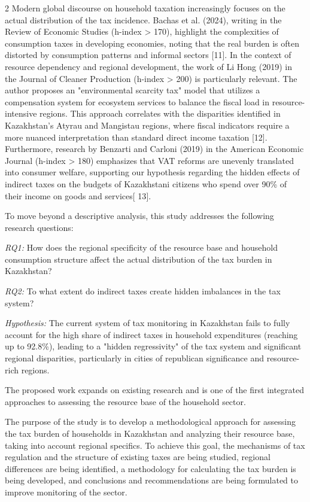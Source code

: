 \begin{multicols}{2}
Modern global discourse on household taxation increasingly focuses on
the actual distribution of the tax incidence. Bachas et al. (2024),
writing in the Review of Economic Studies (h-index \textgreater{} 170),
highlight the complexities of consumption taxes in developing economies,
noting that the real burden is often distorted by consumption patterns
and informal sectors {[}11{]}. In the context of resource dependency and
regional development, the work of Li Hong (2019) in the Journal of
Cleaner Production (h-index \textgreater{} 200) is particularly
relevant. The author proposes an "environmental scarcity tax" model that
utilizes a compensation system for ecosystem services to balance the
fiscal load in resource-intensive regions. This approach correlates with
the disparities identified in Kazakhstan's Atyrau and Mangistau regions,
where fiscal indicators require a more nuanced interpretation than
standard direct income taxation {[}12{]}. Furthermore, research by
Benzarti and Carloni (2019) in the American Economic Journal (h-index
\textgreater{} 180) emphasizes that VAT reforms are unevenly translated
into consumer welfare, supporting our hypothesis regarding the hidden
effects of indirect taxes on the budgets of Kazakhstani citizens who
spend over 90\% of their income on goods and services{[} 13{]}.

To move beyond a descriptive analysis, this study addresses the
following research questions:

\emph{RQ1:} How does the regional specificity of the resource base and
household consumption structure affect the actual distribution of the
tax burden in Kazakhstan?

\emph{RQ2:} To what extent do indirect taxes create hidden imbalances in
the tax system?

\emph{Hypothesis:} The current system of tax monitoring in Kazakhstan
fails to fully account for the high share of indirect taxes in household
expenditures (reaching up to 92.8\%), leading to a "hidden regressivity"
of the tax system and significant regional disparities, particularly in
cities of republican significance and resource-rich regions.

The proposed work expands on existing research and is one of the first
integrated approaches to assessing the resource base of the household
sector.

The purpose of the study is to develop a methodological approach for
assessing the tax burden of households in Kazakhstan and analyzing their
resource base, taking into account regional specifics. To achieve this
goal, the mechanisms of tax regulation and the structure of existing
taxes are being studied, regional differences are being identified, a
methodology for calculating the tax burden is being developed, and
conclusions and recommendations are being formulated to improve
monitoring of the sector.


\end{multicols}
